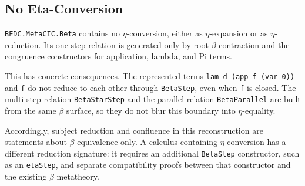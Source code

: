 \subsection{No Eta-Conversion}\label{subsec:reconstruction-no-eta-conversion}

\texttt{BEDC.MetaCIC.Beta} contains no $\eta$-conversion, either as
$\eta$-expansion or as $\eta$-reduction. Its one-step relation is generated
only by root $\beta$ contraction and the congruence constructors for
application, lambda, and Pi terms.

This has concrete consequences. The represented terms
\verb|lam d (app f (var 0))| and \verb|f| do not reduce to each other through
\texttt{BetaStep}, even when \verb|f| is closed. The multi-step relation
\texttt{BetaStarStep} and the parallel relation \texttt{BetaParallel} are
built from the same $\beta$ surface, so they do not blur this boundary into
$\eta$-equality.

Accordingly, subject reduction and confluence in this reconstruction are
statements about $\beta$-equivalence only. A calculus containing
$\eta$-conversion has a different reduction signature: it requires an
additional \texttt{BetaStep} constructor, such as an \texttt{etaStep}, and
separate compatibility proofs between that constructor and the existing
$\beta$ metatheory.
